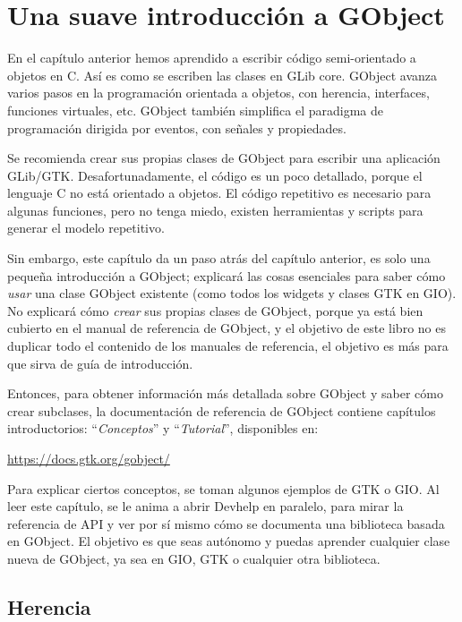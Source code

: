 \chapter{Una suave introducción a GObject}
\label{oop-gobject}

En el capítulo anterior hemos aprendido a escribir código semi-orientado a objetos en C. Así es como se escriben las clases en GLib core. GObject avanza varios pasos en la programación orientada a objetos, con herencia, interfaces, funciones virtuales, etc. GObject también simplifica el paradigma de programación dirigida por eventos, con señales y propiedades.

Se recomienda crear sus propias clases de GObject para escribir una aplicación GLib/GTK. Desafortunadamente, el código es un poco detallado, porque el lenguaje C no está orientado a objetos. El código repetitivo es necesario para algunas funciones, pero no tenga miedo, existen herramientas y scripts para generar el modelo repetitivo.

Sin embargo, este capítulo da un paso atrás del capítulo anterior, es solo una pequeña introducción a GObject; explicará las cosas esenciales para saber cómo \emph{usar} una clase GObject existente (como todos los widgets y clases GTK en GIO). No explicará cómo \emph{crear} sus propias clases de GObject, porque ya está bien cubierto en el manual de referencia de GObject, y el objetivo de este libro no es duplicar todo el contenido de los manuales de referencia, el objetivo es más para que sirva de guía de introducción.

Entonces, para obtener información más detallada sobre GObject y saber cómo crear subclases, la documentación de referencia de GObject contiene capítulos introductorios: ``\emph{Conceptos}'' y ``\emph{Tutorial}'', disponibles en:

\url{https://docs.gtk.org/gobject/}

Para explicar ciertos conceptos, se toman algunos ejemplos de GTK o GIO. Al leer este capítulo, se le anima a abrir Devhelp en paralelo, para mirar la referencia de API y ver por sí mismo cómo se documenta una biblioteca basada en GObject. El objetivo es que seas autónomo y puedas aprender cualquier clase nueva de GObject, ya sea en GIO, GTK o cualquier otra biblioteca.

\section{Herencia}
\label{oop-gobject-inheritance}

